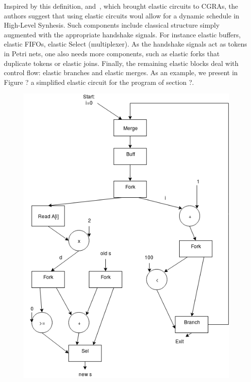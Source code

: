 \documentclass{article}
\begin{document}
Inspired by this definition, and~\cite{DBLP:conf/fpga/HuangITCW13}, which brought elastic circuits to CGRAs, the authors suggest that using elastic circuits woul allow for a dynamic schedule in High-Level Synhesis.
Such components include classical structure simply augmented with the appropriate handshake signals. For instance elastic buffers, elastic FIFOs, elastic Select (multiplexer). As the handshake signals act as tokens in Petri nets, one also needs more components, such as elastic forks that duplicate tokens or elastic joins. Finally, the remaining elastic blocks deal with control flow: elastic branches and elastic merges.
As an example, we present in Figure ? a simplified elastic circuit for the program of section ?.
\begin{figure}
  \center
  \includegraphics[scale=0.3]{circuit.png}
\end{figure}
\end{document}
